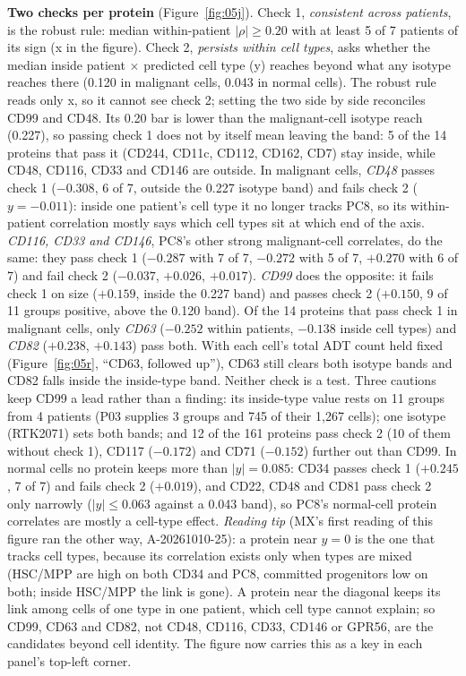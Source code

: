 \textbf{Two checks per protein} (Figure~\ref{fig:05j}). Check 1, \emph{consistent across patients}, is the robust rule: median within-patient $|\rho| \geq 0.20$ with at least 5 of 7 patients of its sign (x in the figure). Check 2, \emph{persists within cell types}, asks whether the median inside patient $\times$ predicted cell type (y) reaches beyond what any isotype reaches there (0.120 in malignant cells, 0.043 in normal cells). The robust rule reads only x, so it cannot see check 2; setting the two side by side reconciles CD99 and CD48. Its 0.20 bar is lower than the malignant-cell isotype reach (0.227), so passing check 1 does not by itself mean leaving the band: 5 of the 14 proteins that pass it (CD244, CD11c, CD112, CD162, CD7) stay inside, while CD48, CD116, CD33 and CD146 are outside. In malignant cells, \emph{CD48} passes check 1 ($-0.308$, 6 of 7, outside the 0.227 isotype band) and fails check 2 ($y = -0.011$): inside one patient's cell type it no longer tracks PC8, so its within-patient correlation mostly says which cell types sit at which end of the axis. \emph{CD116, CD33 and CD146}, PC8's other strong malignant-cell correlates, do the same: they pass check 1 ($-0.287$ with 7 of 7, $-0.272$ with 5 of 7, $+0.270$ with 6 of 7) and fail check 2 ($-0.037$, $+0.026$, $+0.017$). \emph{CD99} does the opposite: it fails check 1 on size ($+0.159$, inside the 0.227 band) and passes check 2 ($+0.150$, 9 of 11 groups positive, above the 0.120 band). Of the 14 proteins that pass check 1 in malignant cells, only \emph{CD63} ($-0.252$ within patients, $-0.138$ inside cell types) and \emph{CD82} ($+0.238$, $+0.143$) pass both. With each cell's total ADT count held fixed (Figure~\ref{fig:05r}, ``CD63, followed up''), CD63 still clears both isotype bands and CD82 falls inside the inside-type band. Neither check is a test. Three cautions keep CD99 a lead rather than a finding: its inside-type value rests on 11 groups from 4 patients (P03 supplies 3 groups and 745 of their 1,267 cells); one isotype (RTK2071) sets both bands; and 12 of the 161 proteins pass check 2 (10 of them without check 1), CD117 ($-0.172$) and CD71 ($-0.152$) further out than CD99. In normal cells no protein keeps more than $|y| = 0.085$: CD34 passes check 1 ($+0.245$, 7 of 7) and fails check 2 ($+0.019$), and CD22, CD48 and CD81 pass check 2 only narrowly ($|y| \leq 0.063$ against a 0.043 band), so PC8's normal-cell protein correlates are mostly a cell-type effect. \emph{Reading tip} (MX's first reading of this figure ran the other way, A-20261010-25): a protein near $y = 0$ is the one that tracks cell types, because its correlation exists only when types are mixed (HSC/MPP are high on both CD34 and PC8, committed progenitors low on both; inside HSC/MPP the link is gone). A protein near the diagonal keeps its link among cells of one type in one patient, which cell type cannot explain; so CD99, CD63 and CD82, not CD48, CD116, CD33, CD146 or GPR56, are the candidates beyond cell identity. The figure now carries this as a key in each panel's top-left corner.


